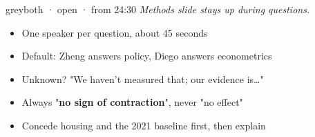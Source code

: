 \documentclass[10pt]{article}
\begin{document}
\begin{card}{grey}{\hfill{\normalsize\mdseries both · open · from 24:30}}
{\large\itshape Methods slide stays up during questions.}\par\smallskip
\begin{itemize}[label=\textcolor{grey}{\textbullet}]\item One speaker per question, about 45 seconds\item Default: Zheng answers policy, Diego answers econometrics\item Unknown? "We haven't measured that; our evidence is…"\item Always "\textbf{no sign of contraction}", never "no effect"\item Concede housing and the 2021 baseline first, then explain\end{itemize}
\end{card}
\hfill
\end{document}
